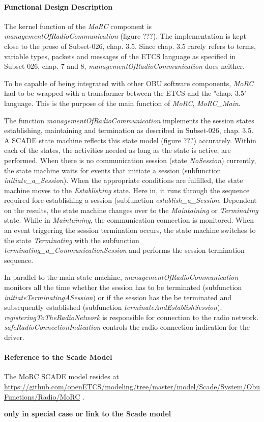 \paragraph{Functional Design Description}

The kernel function of the \textit{MoRC} component is \textit{managementOfRadioCommunication} (figure ???). The implementation is kept close to the prose of Subset-026, chap. 3.5. Since chap. 3.5 rarely refers to terms, variable types, packets and messages of the ETCS language as specified in Subset-026, chap. 7 and 8, \textit{managementOfRadioCommunication} does neither. 

To be capable of being integrated with other OBU software components, \textit{MoRC} had to be wrapped with a transformer between the ETCS and the "chap. 3.5" language. This is the purpose of the main function of \textit{MoRC}, \textit{MoRC\_Main}. 



The function \textit{managementOfRadioCommunication} implements the session states establishing, maintaining and termination as described in Subset-026, chap. 3.5. A SCADE state machine reflects this state model (figure ???) accurately. Within each of the states, the activities needed as long as the state is active, are performed. When there is no communication session (state \textit{NoSession}) currently, the state machine waits for events that initiate a session (subfunction \textit{initiate\_a\_Session}). When the appropriate conditions are fulfilled, the state machine moves to the \textit{Establishing} state. Here in, it runs through the sequence required fore establishing a session (subfunction \textit{establish\_a\_Session}. Dependent on the results, the state machine changes over to the \textit{Maintaining} or \textit{Terminating} state. While in \textit{Maintaining}, the communication connection is monitored. When an event triggering the session termination occurs, the state machine switches to the state \textit{Terminating} with the subfunction \textit{terminating\_a\_CommunicationSession} and performs the session termination sequence. 

In parallel to the main state machine, \textit{managementOfRadioCommunication} monitors all the time whether the session has to be terminated (subfunction \textit{initiateTerminatingASession}) or if the session has the be terminated and subsequently established (subfunction \textit{terminateAndEstablishSession}). \textit{registeringToTheRadioNetwork} is responsible for connection to the radio network. \textit{safeRadioConnectionIndication} controls the radio connection indication for the driver.


\paragraph{Reference to the Scade Model}

The MoRC SCADE model resides at \url{https://github.com/openETCS/modeling/tree/master/model/Scade/System/ObuFunctions/Radio/MoRC} .


\textbf{only in special case or link to the Scade model}


